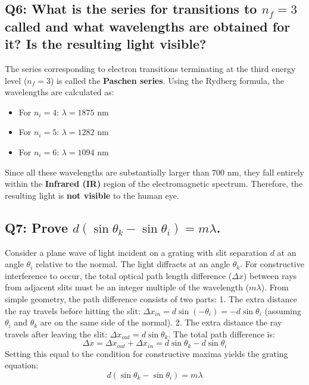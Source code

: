 \documentclass[a4paper,11pt]{article}
\begin{document}
\subsection*{Q6: What is the series for transitions to $n_f = 3$ called and what wavelengths are obtained for it? Is the resulting light visible?}
The series corresponding to electron transitions terminating at the third energy level ($n_f = 3$) is called the \textbf{Paschen series}.
Using the Rydberg formula, the wavelengths are calculated as:
\begin{itemize}
    \item For $n_i = 4$: $\lambda = 1875\text{ nm}$
    \item For $n_i = 5$: $\lambda = 1282\text{ nm}$
    \item For $n_i = 6$: $\lambda = 1094\text{ nm}$
\end{itemize}
Since all these wavelengths are substantially larger than $700\text{ nm}$, they fall entirely within the \textbf{Infrared (IR)} region of the electromagnetic spectrum. Therefore, the resulting light is \textbf{not visible} to the human eye.

\subsection*{Q7: Prove $d(\sin\theta_k - \sin\theta_i) = m\lambda$.}
Consider a plane wave of light incident on a grating with slit separation $d$ at an angle $\theta_i$ relative to the normal. The light diffracts at an angle $\theta_k$. For constructive interference to occur, the total optical path length difference ($\Delta x$) between rays from adjacent slits must be an integer multiple of the wavelength ($m\lambda$).
From simple geometry, the path difference consists of two parts:
1. The extra distance the ray travels before hitting the slit: $\Delta x_{in} = d \sin(-\theta_i) = -d\sin\theta_i$ (assuming $\theta_i$ and $\theta_k$ are on the same side of the normal).
2. The extra distance the ray travels after leaving the slit: $\Delta x_{out} = d \sin\theta_k$.
The total path difference is:
\begin{equation}
    \Delta x = \Delta x_{out} + \Delta x_{in} = d \sin\theta_k - d \sin\theta_i
\end{equation}
Setting this equal to the condition for constructive maxima yields the grating equation:
\begin{equation}
    d(\sin\theta_k - \sin\theta_i) = m\lambda
\end{equation}
\end{document}
